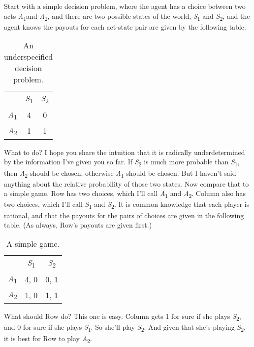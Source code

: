 \documentclass[
  12pt,
  letterpaper,
]{scrbook}
\begin{document}
Start with a simple decision problem, where the agent has a choice
between two acts \emph{A}\textsubscript{1}and \emph{A}\textsubscript{2},
and there are two possible states of the world,
\emph{S}\textsubscript{1} and \emph{S}\textsubscript{2}, and the agent
knows the payouts for each act-state pair are given by the following
table.

\begin{longtable}[]{@{}lcc@{}}
\caption{An underspecified decision
problem.}\label{tbl-underspecified}\tabularnewline
\toprule\noalign{}
\endfirsthead
\endhead
\bottomrule\noalign{}
\endlastfoot
& \emph{S}\textsubscript{1} & \emph{S}\textsubscript{2} \\
\emph{A}\textsubscript{1} & 4 & 0 \\
\emph{A}\textsubscript{2} & 1 & 1 \\
\end{longtable}

What to do? I hope you share the intuition that it is radically
underdetermined by the information I've given you so far. If
\emph{S}\textsubscript{2} is much more probable than
\emph{S}\textsubscript{1}, then \emph{A}\textsubscript{2} should be
chosen; otherwise \emph{A}\textsubscript{1} should be chosen. But I
haven't said anything about the relative probability of those two
states. Now compare that to a simple game. Row has two choices, which
I'll call \emph{A}\textsubscript{1} and \emph{A}\textsubscript{2}.
Column also has two choices, which I'll call \emph{S}\textsubscript{1}
and \emph{S}\textsubscript{2}. It is common knowledge that each player
is rational, and that the payouts for the pairs of choices are given in
the following table. (As always, Row's payouts are given first.)

\begin{longtable}[]{@{}lcc@{}}
\caption{A simple game.}\label{tbl-simple-game}\tabularnewline
\toprule\noalign{}
\endfirsthead
\endhead
\bottomrule\noalign{}
\endlastfoot
& \emph{S}\textsubscript{1} & \emph{S}\textsubscript{2} \\
\emph{A}\textsubscript{1} & 4, 0 & 0, 1 \\
\emph{A}\textsubscript{2} & 1, 0 & 1, 1 \\
\end{longtable}

What should Row do? This one is easy. Column gets 1 for sure if she
plays \emph{S}\textsubscript{2}, and 0 for sure if she plays
\emph{S}\textsubscript{1}. So she'll play \emph{S}\textsubscript{2}. And
given that she's playing \emph{S}\textsubscript{2}, it is best for Row
to play \emph{A}\textsubscript{2}.
\end{document}
